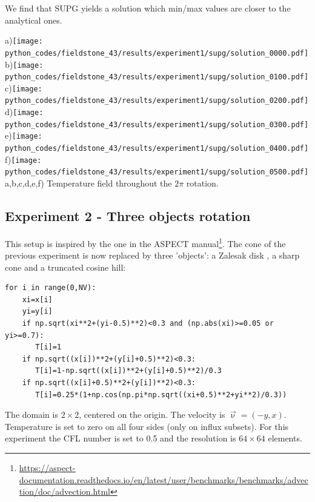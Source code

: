 We find that SUPG yields a solution which min/max values are closer to the analytical ones.

\begin{center}
a)\texttt{[image: python\_codes/fieldstone\_43/results/experiment1/supg/solution\_0000.pdf]}
b)\texttt{[image: python\_codes/fieldstone\_43/results/experiment1/supg/solution\_0100.pdf]}
c)\texttt{[image: python\_codes/fieldstone\_43/results/experiment1/supg/solution\_0200.pdf]}
d)\texttt{[image: python\_codes/fieldstone\_43/results/experiment1/supg/solution\_0300.pdf]}
e)\texttt{[image: python\_codes/fieldstone\_43/results/experiment1/supg/solution\_0400.pdf]}
f)\texttt{[image: python\_codes/fieldstone\_43/results/experiment1/supg/solution\_0500.pdf]}\\
{\captionfont a,b,c,d,e,f) Temperature field throughout the $2\pi$ rotation.} 
\end{center}



\newpage
\subsection*{Experiment 2 - Three objects rotation}

This setup is inspired by the one in the ASPECT 
manual\footnote{\url{https://aspect-documentation.readthedocs.io/en/latest/user/benchmarks/benchmarks/advection/doc/advection.html}}. The cone of the previous 
experiment is now replaced by three 'objects': a Zalesak disk \cite{zale79}, 
a sharp cone and a truncated cosine hill:

\begin{lstlisting}
for i in range(0,NV):
    xi=x[i]
    yi=y[i]
    if np.sqrt(xi**2+(yi-0.5)**2)<0.3 and (np.abs(xi)>=0.05 or yi>=0.7):
       T[i]=1
    if np.sqrt((x[i])**2+(y[i]+0.5)**2)<0.3:
       T[i]=1-np.sqrt((x[i])**2+(y[i]+0.5)**2)/0.3
    if np.sqrt((x[i]+0.5)**2+(y[i])**2)<0.3:
       T[i]=0.25*(1+np.cos(np.pi*np.sqrt((xi+0.5)**2+yi**2)/0.3))
\end{lstlisting}

The domain is $2\times2$, centered on the origin. The velocity is $\vec\upnu=(-y,x)$. Temperature 
is set to zero on all four sides (only on influx subsets). For this experiment the CFL number is set to 0.5
and the resolution is $64\times 64$ elements.


